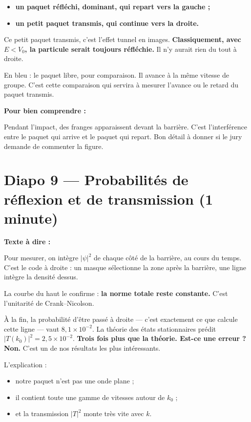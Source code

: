 \documentclass[12pt,a4paper]{article}
\newcommand{\diapo}[2]{\section*{Diapo #1 --- #2}}
\newenvironment{comprendre}%
{\par\medskip\noindent\hrulefill\par\nopagebreak\textbf{Pour bien comprendre :}\par}%
{\par\nopagebreak\noindent\hrulefill\par\medskip}
\begin{document}
	\begin{itemize}
		\item \textbf{un paquet réfléchi, dominant, qui repart vers la gauche ;}
		\item \textbf{un petit paquet transmis, qui continue vers la droite.}
	\end{itemize}
	
	Ce petit paquet transmis, c'est l'effet tunnel en images.
	\textbf{Classiquement, avec $E < V_0$, la particule serait toujours réfléchie.}
	Il n'y aurait rien du tout à droite.
	
	En bleu : le paquet libre, pour comparaison.
	Il avance à la même vitesse de groupe.
	C'est cette comparaison qui servira à mesurer l'avance ou le retard
	du paquet transmis.
	
	\begin{comprendre}
		Pendant l'impact, des franges apparaissent devant la barrière.
		C'est l'interférence entre le paquet qui arrive et le paquet qui repart.
		Bon détail à donner si le jury demande de commenter la figure.
	\end{comprendre}
	
	\clearpage
	\diapo{9}{Probabilités de réflexion et de transmission (1 minute)}
	
	\textbf{Texte à dire :}
	
	Pour mesurer, on intègre $|\psi|^2$ de chaque côté de la barrière,
	au cours du temps. C'est le code à droite :
	un masque sélectionne la zone après la barrière,
	une ligne intègre la densité dessus.
	
	La courbe du haut le confirme : \textbf{la norme totale reste constante.}
	C'est l'unitarité de Crank--Nicolson.
	
	À la fin, la probabilité d'être passé à droite --- c'est exactement ce que
	calcule cette ligne --- vaut $8{,}1\times10^{-2}$.
	La théorie des états stationnaires prédit $|T(k_0)|^2 = 2{,}5\times10^{-2}$.
	\textbf{Trois fois plus que la théorie. Est-ce une erreur ? Non.}
	C'est un de nos résultats les plus intéressants.
	
	L'explication :
	
	\begin{itemize}
		\item notre paquet n'est pas une onde plane ;
		\item il contient toute une gamme de vitesses autour de $k_0$ ;
		\item et la transmission $|T|^2$ monte très vite avec $k$.
	\end{itemize}
	
\end{document}
